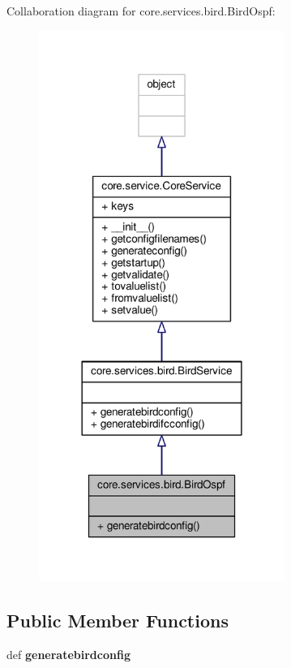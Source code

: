 Collaboration diagram for core.\+services.\+bird.\+Bird\+Ospf\+:
\nopagebreak
\begin{figure}[H]
\begin{center}
\leavevmode
\includegraphics[width=227pt]{classcore_1_1services_1_1bird_1_1_bird_ospf__coll__graph}
\end{center}
\end{figure}
\subsection*{Public Member Functions}
\begin{DoxyCompactItemize}
\item 
\hypertarget{classcore_1_1services_1_1bird_1_1_bird_ospf_acfa6dd58ebf125bfbf337c83a4b603d8}{def {\bfseries generatebirdconfig}}\label{classcore_1_1services_1_1bird_1_1_bird_ospf_acfa6dd58ebf125bfbf337c83a4b603d8}

\end{DoxyCompactItemize}
